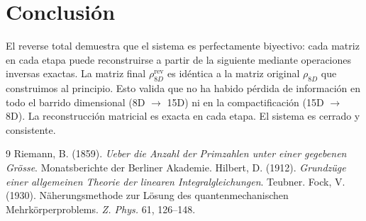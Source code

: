 \documentclass[12pt,a4paper]{article}
\begin{document}
\section{Conclusión}

El reverse total demuestra que el sistema es perfectamente biyectivo: cada matriz en cada etapa puede reconstruirse a partir de la siguiente mediante operaciones inversas exactas. La matriz final \(\rho_{8D}^{\text{rev}}\) es idéntica a la matriz original \(\rho_{8D}\) que construimos al principio. Esto valida que no ha habido pérdida de información en todo el barrido dimensional (8D $\to$ 15D) ni en la compactificación (15D $\to$ 8D). La reconstrucción matricial es exacta en cada etapa. El sistema es cerrado y consistente.

\begin{thebibliography}{9}
 Riemann, B. (1859). \emph{Ueber die Anzahl der Primzahlen unter einer gegebenen Grösse}. Monatsberichte der Berliner Akademie.
 Hilbert, D. (1912). \emph{Grundzüge einer allgemeinen Theorie der linearen Integralgleichungen}. Teubner.
 Fock, V. (1930). Näherungsmethode zur Lösung des quantenmechanischen Mehrkörperproblems. \emph{Z. Phys.} 61, 126--148.
\end{thebibliography}
\end{document}
